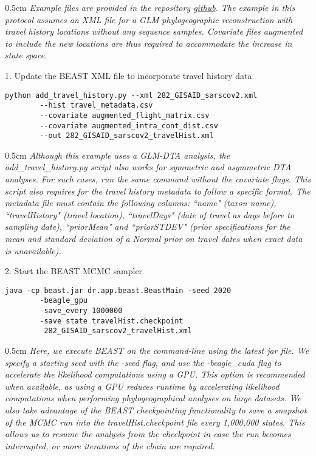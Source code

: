 \documentclass{article}
\newcommand{\ann}[1]{
\begin{adjustwidth}{0.5cm}{}
\it{#1}\\
\end{adjustwidth}}
\begin{document}
\ann{Example files are provided in the repository {\upshape\url{github}}. The example in this protocol assumes an XML file for a GLM phylogeographic reconstruction with travel history locations without any sequence samples. Covariate files augmented to include the new locations are thus required to accommodate the increase in state space.}

1. Update the BEAST XML file to incorporate travel history data
\begin{verbatim}
python add_travel_history.py --xml 282_GISAID_sarscov2.xml
        --hist travel_metadata.csv
        --covariate augmented_flight_matrix.csv
        --covariate augmented_intra_cont_dist.csv
        --out 282_GISAID_sarscov2_travelHist.xml
\end{verbatim}

\ann{Although this example uses a GLM-DTA analysis, the add\_travel\_history.py script also works for symmetric and asymmetric DTA analyses. For such cases, run the same command without the covariate flags. This script also requires for the travel history metadata to follow a specific format. The metadata file must contain the following columns: ``name"  (taxon name), ``travelHistory"  (travel location), ``travelDays"  (date of travel as days before to sampling date), ``priorMean"  and ``priorSTDEV"  (prior specifications for the mean and standard deviation of a Normal prior on travel dates when exact data is unavailable).}

2. Start the BEAST MCMC sampler
\begin{verbatim}
java -cp beast.jar dr.app.beast.BeastMain -seed 2020  
        -beagle_gpu
        -save_every 1000000
        -save_state travelHist.checkpoint
         282_GISAID_sarscov2_travelHist.xml
\end{verbatim}

\ann{Here, we execute BEAST on the command-line using the latest jar file. We specify a starting seed with the -seed flag, and use the -beagle\_cuda flag to accelerate the likelihood computations using a GPU. This option is recommended when available, as using a GPU reduces runtime by accelerating likelihood computations when performing phylogeographical analyses on large datasets. We also take advantage of the BEAST checkpointing functionality to save a snapshot of the MCMC run into the travelHist.checkpoint file every 1,000,000 states. This allows us to resume the analysis from the checkpoint in case the run becomes interrupted, or more iterations of the chain are required.}
\end{document}

